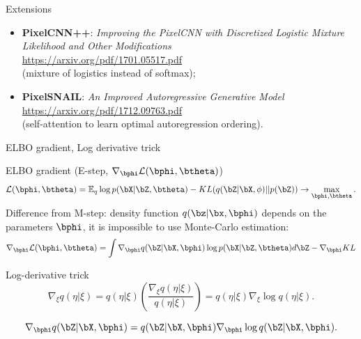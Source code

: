 \begin{frame}{Extensions}
\begin{itemize}
	\item \textbf{PixelCNN++}: \textit{Improving the PixelCNN with Discretized Logistic Mixture Likelihood and Other Modifications} \\
	\href{https://arxiv.org/pdf/1701.05517.pdf}{https://arxiv.org/pdf/1701.05517.pdf} \\
	(mixture of logistics instead of softmax);
	\item \textbf{PixelSNAIL}: \textit{An Improved Autoregressive Generative Model} \\
	\href{https://arxiv.org/pdf/1712.09763.pdf}{https://arxiv.org/pdf/1712.09763.pdf} \\
	(self-attention to learn optimal autoregression ordering).
\end{itemize}
\end{frame}
\begin{frame}{ELBO gradient, Log derivative trick}
\end{frame}
\begin{frame}{ELBO gradient (E-step, $\nabla_{\bphi} \mathcal{L}(\bphi, \btheta)$)}
\vspace{-0.3cm}
\[
	\mathcal{L} (\bphi, \btheta)  = \mathbb{E}_{q} \log p(\bX | \bZ, \btheta) - KL (q(\bZ| \bX, \phi) || p(\bZ)) \rightarrow \max_{\bphi, \btheta}.
\]
	Difference from M-step: density function $q(\bz| \bx, \bphi)$ depends on the parameters $\bphi$, it is impossible to use Monte-Carlo estimation:
	\[
		\nabla_{\bphi} \mathcal{L} (\bphi, \btheta) = \int \nabla_{\bphi} q(\bZ| \bX, \bphi) \log p(\bX |\bZ, \btheta) d\bZ - \nabla_{\bphi} KL
	\]
	
	\begin{block}{Log-derivative trick}
	    \[
	    \nabla_\xi q(\eta| \xi) = q(\eta | \xi) \left( \frac{\nabla_\xi q(\eta | \xi)}{q(\eta| \xi)} \right) = q(\eta | \xi) \nabla_\xi \log q(\eta| \xi).
	    \]
	\end{block}
	\[
		\nabla_{\bphi} q(\bZ| \bX, \bphi) = q(\bZ| \bX, \bphi) \nabla_{\bphi} \log q(\bZ| \bX, \bphi).
	\]
\end{frame}
